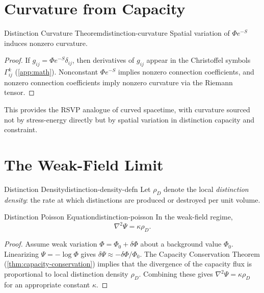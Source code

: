 \documentclass[12pt,twoside,openright]{book}
\begin{document}
\section{Curvature from Capacity}
\label{sec:ch17-curvature}

\begin{theorem}{Distinction Curvature Theorem}{distinction-curvature}
  Spatial variation of $\Phi e^{-S}$ induces nonzero
  curvature.
\end{theorem}

\begin{proof}
  If $g_{ij} = \Phi e^{-S}\delta_{ij}$, then derivatives of
  $g_{ij}$ appear in the Christoffel symbols
  $\Gamma^k_{ij}$ (\cref{app:math}). Nonconstant
  $\Phi e^{-S}$ implies nonzero connection coefficients,
  and nonzero connection coefficients imply nonzero
  curvature via the Riemann tensor.
\end{proof}

This provides the RSVP analogue of curved spacetime, with
curvature sourced not by stress-energy directly but by
spatial variation in distinction capacity and constraint.

\section{The Weak-Field Limit}
\label{sec:ch17-weakfield}

\begin{definition}{Distinction Density}{distinction-density-defn}
  Let $\rho_D$ denote the local \emph{distinction density}:
  the rate at which distinctions are produced or destroyed
  per unit volume.
\end{definition}

\begin{theorem}{Distinction Poisson Equation}{distinction-poisson}
  In the weak-field regime,
  \[
    \nabla^2 \Psi = \kappa \rho_D.
  \]
\end{theorem}

\begin{proof}
  Assume weak variation $\Phi = \Phi_0 + \delta\Phi$ about
  a background value $\Phi_0$. Linearizing
  $\Psi = -\log\Phi$ gives $\delta\Psi \approx
  -\delta\Phi/\Phi_0$. The Capacity Conservation Theorem
  (\cref{thm:capacity-conservation}) implies that the
  divergence of the capacity flux is proportional to local
  distinction density $\rho_D$. Combining these gives
  $\nabla^2\Psi = \kappa\rho_D$ for an appropriate constant
  $\kappa$.
\end{proof}
\end{document}
